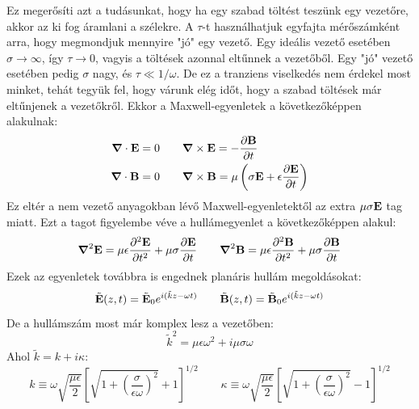 \documentclass[a4paper,12pt]{article}
\begin{document}
Ez megerősíti azt a tudásunkat, hogy ha egy szabad töltést teszünk egy vezetőre, akkor az ki fog áramlani a szélekre. A $\tau$-t használhatjuk egyfajta mérőszámként arra, hogy
megmondjuk mennyire "jó" egy vezető. Egy ideális vezető esetében $\sigma \to \infty$, így $\tau \to 0$, vagyis a töltések azonnal eltűnnek a vezetőből. Egy "jó" vezető esetében pedig $\sigma$ nagy, és $\tau \ll 1/\omega$.
De ez a tranziens viselkedés nem érdekel most minket, tehát tegyük fel, hogy várunk elég időt, hogy a szabad töltések már eltűnjenek a vezetőkről. Ekkor a Maxwell-egyenletek a következőképpen alakulnak:
\begin{equation}
    \begin{aligned}
        \boldsymbol{\nabla} \cdot \bold{E} &= 0 \qquad \boldsymbol{\nabla} \times \bold{E} = -\frac{\partial \bold{B}}{\partial t} \\
        \boldsymbol{\nabla} \cdot \bold{B} &= 0 \qquad \boldsymbol{\nabla} \times \bold{B} = \mu \left( \sigma \bold{E} + \epsilon \frac{\partial \bold{E}}{\partial t} \right)
    \end{aligned}
\end{equation}
Ez eltér a nem vezető anyagokban lévő Maxwell-egyenletektől az extra $\mu \sigma \bold{E}$ tag miatt. Ezt a tagot figyelembe véve a hullámegyenlet a következőképpen alakul:
\begin{equation}
    \boldsymbol{\nabla}^2 \bold{E} = \mu \epsilon \frac{\partial^2 \bold{E}}{\partial t^2} + \mu \sigma \frac{\partial \bold{E}}{\partial t} \qquad \boldsymbol{\nabla}^2 \bold{B} = \mu \epsilon \frac{\partial^2 \bold{B}}{\partial t^2} + \mu \sigma \frac{\partial \bold{B}}{\partial t}
\end{equation}
Ezek az egyenletek továbbra is engednek planáris hullám megoldásokat:
\begin{equation}
    \tilde{\bold{E}}(z, t) = \tilde{\bold{E}}_0 e^{i(\tilde{k}z - \omega t)} \qquad \tilde{\bold{B}}(z, t) = \tilde{\bold{B}}_0 e^{i(\tilde{k}z - \omega t)}
\end{equation}
De a hullámszám most már komplex lesz a vezetőben:
\begin{equation}
    \tilde{k}^2 = \mu \epsilon \omega^2 + i \mu \sigma \omega
\end{equation}
Ahol $\tilde{k} = k + i \kappa$:
\begin{equation}
    k \equiv \omega \sqrt{\frac{\mu \epsilon}{2}} \left[ \sqrt{1 + \left( \frac{\sigma}{\epsilon \omega} \right)^2} + 1 \right]^{1/2} \qquad \kappa \equiv \omega \sqrt{\frac{\mu \epsilon}{2}} \left[ \sqrt{1 + \left( \frac{\sigma}{\epsilon \omega} \right)^2} - 1 \right]^{1/2}
\end{equation}
\end{document}
